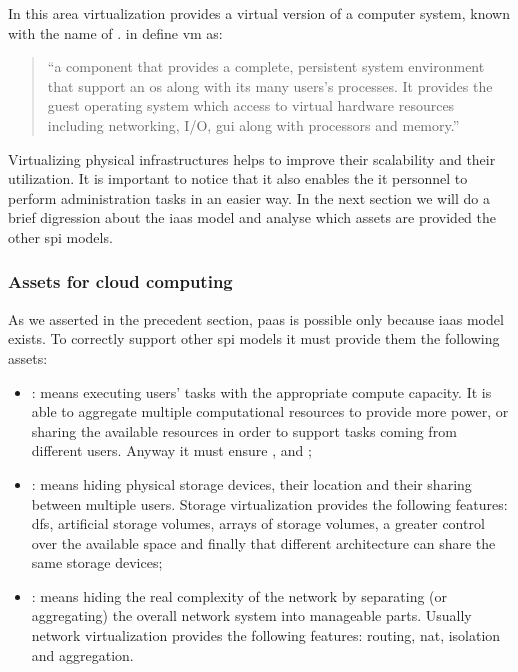 In this area virtualization provides a virtual version of a computer system, known with the name of
. \citeauthor{vmArchitecture} in \cite{vmArchitecture} define \ac{vm} as:

\begin{quote}
	``a component that provides a complete, persistent system environment that support an \acs{os}
	along with its many users's processes. It provides the guest operating system which access to
	virtual hardware resources including networking, I/O, \ac{gui} along with processors and memory.''
\end{quote}

Virtualizing physical infrastructures helps to improve their scalability and their utilization. It is 
important to notice that it also enables the \acs{it} personnel to perform administration tasks in an
easier way. In the next section we will do a brief digression about the \ac{iaas} model and analyse
which assets are provided the other \ac{spi} models.

\subsubsection{Assets for cloud computing}
\label{sec:problemSpace-paas-virtualization-assets}
As we asserted in the precedent section, \ac{paas} is possible only because \ac{iaas} model exists.
To correctly support other \ac{spi} models it must provide them the following assets:

\begin{itemize}
	\item{: means executing users' tasks with the appropriate compute capacity. It is
		able to aggregate multiple computational resources to provide more power, or sharing the available
		resources in order to support tasks coming from different users. Anyway it must ensure
		,  and ;}
	\item{: means hiding physical storage devices, their location and their sharing between
		multiple users. Storage virtualization provides the following features: \ac{dfs},
		artificial storage volumes, arrays of storage volumes, a greater control over the available space and
		finally that different architecture can share the same storage devices;}
	\item{: means hiding the real complexity of the network by separating (or aggregating)
		the overall network system into manageable parts. Usually network virtualization provides the 
		following features: routing, \ac{nat}, isolation and aggregation.}
\end{itemize}

